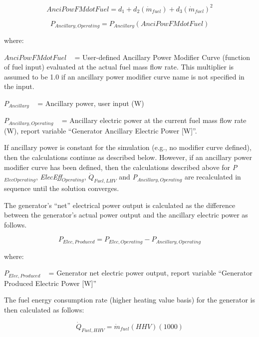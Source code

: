 \begin{equation}
AnciPowFMdotFuel = {d_1} + {d_2}\left( {{{\dot m}_{fuel}}} \right) + {d_3}{\left( {{{\dot m}_{fuel}}} \right)^2}
\end{equation}

\begin{equation}
{P_{Ancillary,Operating}} = {P_{Ancillary}}\left( {AnciPowFMdotFuel} \right)
\end{equation}

where:

\(AnciPowFMdotFuel\) ~ = User-defined Ancillary Power Modifier Curve (function of fuel input) evaluated at the actual fuel mass flow rate. This multiplier is assumed to be 1.0 if an ancillary power modifier curve name is not specified in the input.

\({P_{Ancillary}}\) ~ = Ancillary power, user input (W)

\({P_{Ancillary,Operating}}\) ~ = Ancillary electric power at the current fuel mass flow rate (W), report variable ``Generator Ancillary Electric Power {[}W{]}''.

If ancillary power is constant for the simulation (e.g., no modifier curve defined), then the calculations continue as described below. However, if an ancillary power modifier curve has been defined, then the calculations described above for \emph{P\(_{ElecOperating}\)}, \emph{ElecEff\(_{Operating}\)}, \({\dot Q_{Fuel,LHV}}\) and \emph{P\(_{Ancillary,Operating}\)} are recalculated in sequence until the solution converges.

The generator's ``net'' electrical power output is calculated as the difference between the generator's actual power output and the ancillary electric power as follows.

\begin{equation}
{P_{Elec,Produced}} = {P_{Elec,Operating}} - {P_{Ancillary,Operating}}
\end{equation}

where:

\({P_{Elec,Produced}}\) ~ = Generator net electric power output, report variable ``Generator Produced Electric Power {[}W{]}''

The fuel energy consumption rate (higher heating value basis) for the generator is then calculated as follows:

\begin{equation}
{\dot Q_{Fuel,HHV}} = {\dot m_{fuel}}\left( {HHV} \right)\left( {1000} \right)
\end{equation}

